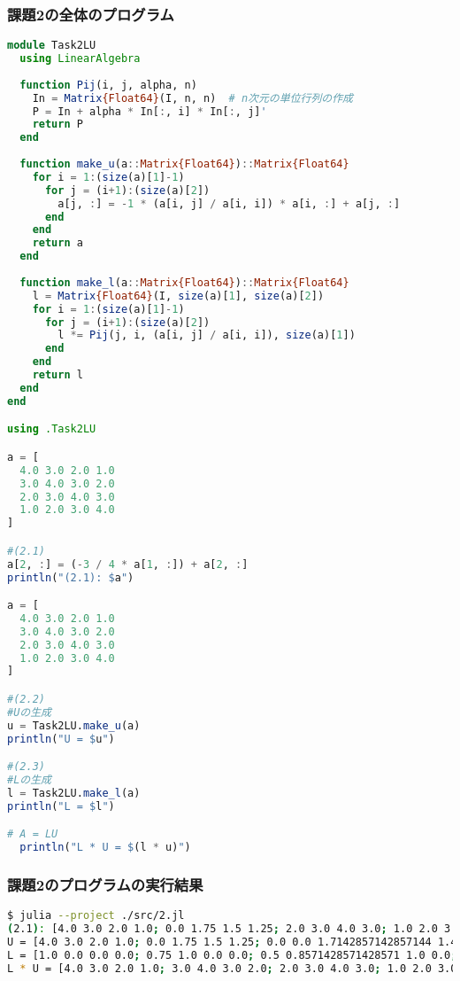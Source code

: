 \documentclass[uplatex, dvipdfmx, a4j,11pt]{jsarticle}
\begin{document}
\subsubsection*{課題2の全体のプログラム}
\begin{lstlisting}[title={課題2の全体のプログラム}, label=code:in, language=Julia]
module Task2LU
  using LinearAlgebra
  
  function Pij(i, j, alpha, n)
    In = Matrix{Float64}(I, n, n)  # n次元の単位行列の作成
    P = In + alpha * In[:, i] * In[:, j]'
    return P
  end
  
  function make_u(a::Matrix{Float64})::Matrix{Float64}
    for i = 1:(size(a)[1]-1)
      for j = (i+1):(size(a)[2])
        a[j, :] = -1 * (a[i, j] / a[i, i]) * a[i, :] + a[j, :]
      end
    end
    return a
  end
  
  function make_l(a::Matrix{Float64})::Matrix{Float64}
    l = Matrix{Float64}(I, size(a)[1], size(a)[2])
    for i = 1:(size(a)[1]-1)
      for j = (i+1):(size(a)[2])
        l *= Pij(j, i, (a[i, j] / a[i, i]), size(a)[1])
      end
    end
    return l
  end
end

using .Task2LU

a = [
  4.0 3.0 2.0 1.0
  3.0 4.0 3.0 2.0
  2.0 3.0 4.0 3.0
  1.0 2.0 3.0 4.0
]

#(2.1)
a[2, :] = (-3 / 4 * a[1, :]) + a[2, :]
println("(2.1): $a")

a = [
  4.0 3.0 2.0 1.0
  3.0 4.0 3.0 2.0
  2.0 3.0 4.0 3.0
  1.0 2.0 3.0 4.0
]

#(2.2)
#Uの生成
u = Task2LU.make_u(a)
println("U = $u")

#(2.3)
#Lの生成
l = Task2LU.make_l(a)
println("L = $l")

# A = LU
  println("L * U = $(l * u)")
\end{lstlisting}

\subsubsection*{課題2のプログラムの実行結果}
\begin{lstlisting}[title={課題2のプログラムの実行結果}, label=code:in, language=sh]
$ julia --project ./src/2.jl
(2.1): [4.0 3.0 2.0 1.0; 0.0 1.75 1.5 1.25; 2.0 3.0 4.0 3.0; 1.0 2.0 3.0 4.0]
U = [4.0 3.0 2.0 1.0; 0.0 1.75 1.5 1.25; 0.0 0.0 1.7142857142857144 1.4285714285714286; 0.0 0.0 0.0 1.6666666666666667]
L = [1.0 0.0 0.0 0.0; 0.75 1.0 0.0 0.0; 0.5 0.8571428571428571 1.0 0.0; 0.25 0.7142857142857143 0.8333333333333333 1.0]
L * U = [4.0 3.0 2.0 1.0; 3.0 4.0 3.0 2.0; 2.0 3.0 4.0 3.0; 1.0 2.0 3.0 4.0]
\end{lstlisting}
\end{document}
